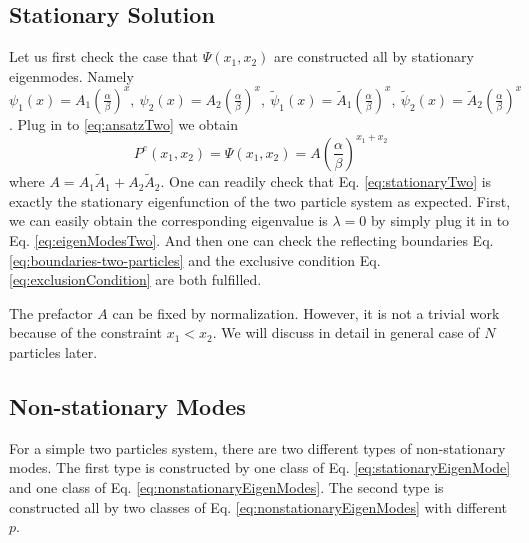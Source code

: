 \documentclass[12pt,a4paper]{article}
\begin{document}
\subsection{Stationary Solution}
\label{sub:stationary_soution}
Let us first check the case that $\Psi(x_1, x_2)$ are constructed all by
stationary eigenmodes. Namely $
\psi_1(x) = A_1\left(\frac{\alpha}{\beta}\right)^x,
~\psi_2(x) = A_2\left(\frac{\alpha}{\beta}\right)^x,
~\tilde{\psi}_1(x) = \tilde{A}_1\left(\frac{\alpha}{\beta}\right)^x,
~\tilde{\psi}_2(x) = \tilde{A}_2\left(\frac{\alpha}{\beta}\right)^x$. 
Plug in to \eqref{eq:ansatzTwo} we obtain
\begin{equation}
    \label{eq:stationaryTwo}
    P^e(x_1, x_2) = \Psi(x_1, x_2) = 
    A \left(\frac{\alpha}{\beta}\right)^{x_1+x_2}
\end{equation}
where $A=A_1\tilde{A}_1+A_2\tilde{A}_2$. One can readily check that Eq.
\eqref{eq:stationaryTwo} is exactly the stationary eigenfunction of the two
particle system as expected. First, we can easily obtain the corresponding
eigenvalue is $\lambda=0$ by simply plug it in to Eq. \eqref{eq:eigenModesTwo}.
And then one can check the reflecting boundaries Eq.
\eqref{eq:boundaries-two-particles} and the exclusive condition Eq.
\eqref{eq:exclusionCondition} are both fulfilled. 

The prefactor $A$ can be fixed by normalization. However, it is not a trivial
work because of the constraint $x_1 < x_2$. We will discuss in detail in
general case of $N$ particles later. 

\subsection{Non-stationary Modes}
\label{sub:non_stationary_modes}

For a simple two particles system, there are two different types of
non-stationary modes. The first type is constructed by one class of Eq.
\eqref{eq:stationaryEigenMode} and one class of Eq.
\eqref{eq:nonstationaryEigenModes}. The second type is constructed all by two
classes of Eq. \eqref{eq:nonstationaryEigenModes} with different $p$.
\end{document}
